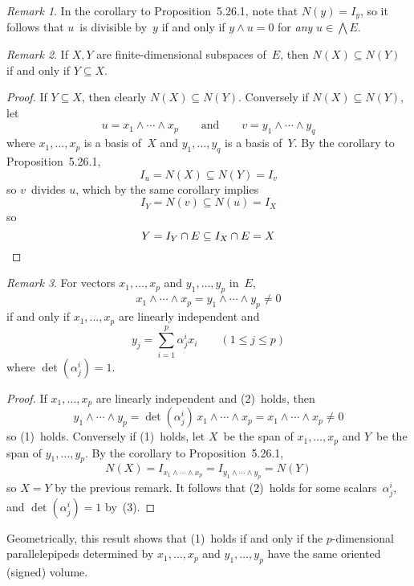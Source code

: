 \documentclass[letterpaper,12pt]{article}
\newcommand{\sect}{\cap}
\newcommand{\eprod}{\wedge}
\newcommand{\bigeprod}{\bigwedge}
\newcommand{\medeprod}{{\textstyle\bigeprod}}
\newcommand{\multi}[4]{#2_{#3}#1\cdots#1#2_{#4}}
\newcommand{\eprods}[3]{\multi{\eprod}{#1}{#2}{#3}}
\theoremstyle{definition}
\theoremstyle{remark}
\newtheorem*{rmk}{Remark}
\begin{document}
\begin{rmk}
In the corollary to Proposition~5.26.1, note that \(N(y)=I_y\), so it follows that \(u\)~is divisible by~\(y\) if and only if \(y\eprod u=0\) for \emph{any} \(u\in\medeprod E\).
\end{rmk}

\begin{rmk}
If \(X,Y\) are finite-dimensional subspaces of~\(E\), then \(N(X)\subseteq N(Y)\) if and only if \(Y\subseteq X\).
\end{rmk}
\begin{proof}
If \(Y\subseteq X\), then clearly \(N(X)\subseteq N(Y)\). Conversely if \(N(X)\subseteq N(Y)\), let
\[u=\eprods{x}{1}{p}\qquad\text{and}\qquad v=\eprods{y}{1}{q}\]
where \(x_1,\ldots,x_p\) is a basis of~\(X\) and \(y_1,\ldots,y_q\) is a basis of~\(Y\). By the corollary to Proposition~5.26.1,
\[I_u=N(X)\subseteq N(Y)=I_v\]
so \(v\)~divides \(u\), which by the same corollary implies
\[I_Y=N(v)\subseteq N(u)=I_X\]
so
\[Y=I_Y\sect E\subseteq I_X\sect E=X\qedhere\]
\end{proof}

\begin{rmk}
For vectors \(x_1,\ldots,x_p\) and \(y_1,\ldots,y_p\) in~\(E\),
\[\eprods{x}{1}{p}=\eprods{y}{1}{p}\ne 0\tag{1}\]
if and only if \(x_1,\ldots,x_p\) are linearly independent and
\[y_j=\sum_{i=1}^p\alpha_j^i x_i\qquad(1\le j\le p)\tag{2}\]
where \(\det(\alpha_j^i)=1\).
\end{rmk}
\begin{proof}
If \(x_1,\ldots,x_p\) are linearly independent and (2)~holds, then
\[\eprods{y}{1}{p}=\det(\alpha_j^i)\,\eprods{x}{1}{p}=\eprods{x}{1}{p}\ne 0\tag{3}\]
so (1)~holds. Conversely if (1)~holds, let \(X\)~be the span of \(x_1,\ldots,x_p\) and \(Y\)~be the span of \(y_1,\ldots,y_p\). By the corollary to Proposition~5.26.1,
\[N(X)=I_{\eprods{x}{1}{p}}=I_{\eprods{y}{1}{p}}=N(Y)\]
so \(X=Y\) by the previous remark. It follows that (2)~holds for some scalars~\(\alpha_j^i\), and \(\det(\alpha_j^i)=1\) by~(3).
\end{proof}
\noindent Geometrically, this result shows that (1)~holds if and only if the \(p\)-dimensional parallelepipeds determined by \(x_1,\ldots,x_p\) and \(y_1,\ldots,y_p\) have the same oriented (signed) volume.
\end{document}
